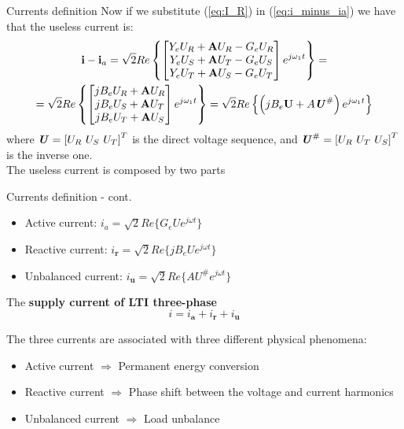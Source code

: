 \documentclass[aspectratio=169]{beamer}
\begin{document}
\begin{frame}{Currents definition}{\insertsection}
    Now if we substitute (\ref{eq:I_R}) in (\ref{eq:i_minus_ia}) we have that the useless current is:
    \begin{gather}
        \textbf{i} - \textbf{i}_a = \sqrt{2} Re\left\{
        \begin{bmatrix}
        Y_e U_R + \textbf{A} U_R - G_e U_R \\
        Y_e U_S + \textbf{A} U_T - G_e U_S \\
        Y_e U_T + \textbf{A} U_S - G_e U_T
        \end{bmatrix}
e^{j\omega_1t}\right\} = \notag \\
= \sqrt{2} Re\left\{
        \begin{bmatrix}
        j B_e U_R + \textbf{A} U_R \\
        j B_e U_S + \textbf{A} U_T \\
        j B_e U_T + \textbf{A} U_S 
        \end{bmatrix}
e^{j\omega_1t}\right\} = \sqrt{2} Re\left\{\left(jB_e\textbf{U} + A\textbf{\textit{U}}^{\#}\right)e^{j\omega_1t}\right\} 
    \end{gather}
     where $\textbf{\textit{U}} = \left[U_R \ U_S \ U_T\right]^T$ is the direct voltage sequence, and $\textbf{\textit{U}}^{\#} = \left[U_R \ U_T \ U_S\right]^T$ is the inverse one.\\
     \textcolor{NTNU_orange}{The useless current is composed by two parts}
\end{frame}

\begin{frame}{Currents definition - cont.}{\insertsection}
    \begin{itemize}
      \item Active current: $\pmb{\mathit{i}}_{a} = \sqrt{2}Re\{G_e\pmb{\mathit{U}}e^{j\omega t}\}$
      \item Reactive current: $\pmb{\mathit{i}_{r}} = \sqrt{2}Re\{jB_e\pmb{\mathit{U}}e^{j\omega t}\}$
      \item Unbalanced current: $\pmb{\mathit{i}_{u}} = \sqrt{2}Re\{A\pmb{\mathit{U}}^{\#}e^{j\omega t}\}$
    \end{itemize}

    The \textbf{supply current of LTI three-phase}
    \begin{equation}
      \pmb{\mathit{i}} = \pmb{\mathit{i}_{a}} + \pmb{\mathit{i}_{r}} + \pmb{\mathit{i}_{u}}
      \label{eq:eq_i3P}
    \end{equation}

    The three currents are associated with three different physical phenomena:
    \begin{itemize}
      \item Active current $\Rightarrow$ Permanent energy conversion
      \item Reactive current $\Rightarrow$ Phase shift between the voltage and current harmonics
      \item Unbalanced current $\Rightarrow$ Load unbalance
    \end{itemize}
  \end{frame}
\end{document}
